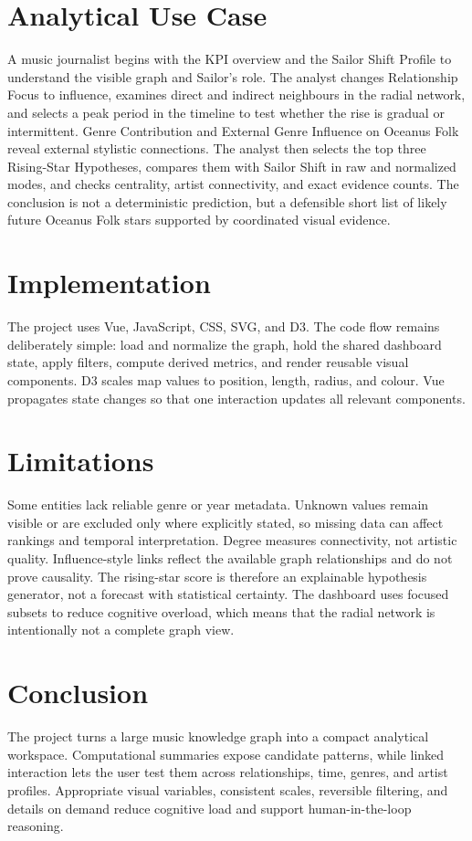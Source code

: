 \documentclass[9pt,a4paper]{article}
\begin{document}
\clearpage
\section{Analytical Use Case}
A music journalist begins with the KPI overview and the Sailor Shift Profile to understand the visible graph and Sailor's role. The analyst changes Relationship Focus to influence, examines direct and indirect neighbours in the radial network, and selects a peak period in the timeline to test whether the rise is gradual or intermittent. Genre Contribution and External Genre Influence on Oceanus Folk reveal external stylistic connections. The analyst then selects the top three Rising-Star Hypotheses, compares them with Sailor Shift in raw and normalized modes, and checks centrality, artist connectivity, and exact evidence counts. The conclusion is not a deterministic prediction, but a defensible short list of likely future Oceanus Folk stars supported by coordinated visual evidence.

\section{Implementation}
The project uses Vue, JavaScript, CSS, SVG, and D3. The code flow remains deliberately simple: load and normalize the graph, hold the shared dashboard state, apply filters, compute derived metrics, and render reusable visual components. D3 scales map values to position, length, radius, and colour. Vue propagates state changes so that one interaction updates all relevant components.

\section{Limitations}
Some entities lack reliable genre or year metadata. Unknown values remain visible or are excluded only where explicitly stated, so missing data can affect rankings and temporal interpretation. Degree measures connectivity, not artistic quality. Influence-style links reflect the available graph relationships and do not prove causality. The rising-star score is therefore an explainable hypothesis generator, not a forecast with statistical certainty. The dashboard uses focused subsets to reduce cognitive overload, which means that the radial network is intentionally not a complete graph view.

\section{Conclusion}
The project turns a large music knowledge graph into a compact analytical workspace. Computational summaries expose candidate patterns, while linked interaction lets the user test them across relationships, time, genres, and artist profiles. Appropriate visual variables, consistent scales, reversible filtering, and details on demand reduce cognitive load and support human-in-the-loop reasoning.
\end{document}
